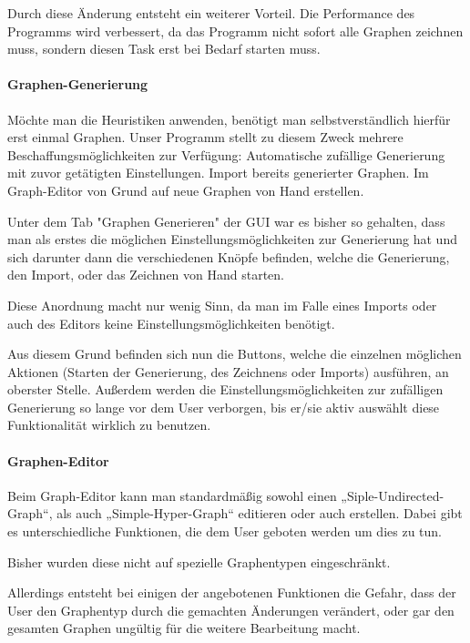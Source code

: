 \documentclass{article}
\begin{document}
				Durch diese Änderung entsteht ein weiterer Vorteil.
				Die Performance des Programms wird verbessert, da das Programm nicht sofort alle Graphen zeichnen muss, sondern diesen Task erst bei Bedarf starten muss.
		
		\paragraph{Graphen-Generierung}
			Möchte man die Heuristiken anwenden, benötigt man selbstverständlich hierfür erst einmal Graphen.
			Unser Programm stellt zu diesem Zweck mehrere Beschaffungsmöglichkeiten zur Verfügung:
				Automatische zufällige Generierung mit zuvor getätigten Einstellungen.
				Import bereits generierter Graphen.
				Im Graph-Editor von Grund auf neue Graphen von Hand erstellen.
			
			Unter dem Tab "Graphen Generieren" der GUI war es bisher so gehalten, dass man als erstes die möglichen Einstellungsmöglichkeiten zur Generierung hat und sich darunter dann die verschiedenen Knöpfe befinden, welche die Generierung, den Import, oder das Zeichnen von Hand starten.
			
			Diese Anordnung macht nur wenig Sinn, da man im Falle eines Imports oder auch des Editors keine Einstellungsmöglichkeiten benötigt.
			
			Aus diesem Grund befinden sich nun die Buttons, welche die einzelnen möglichen Aktionen (Starten der Generierung, des Zeichnens oder Imports) ausführen, an oberster Stelle.
			Außerdem werden die Einstellungsmöglichkeiten zur zufälligen Generierung so lange vor dem User verborgen, bis er/sie aktiv auswählt diese Funktionalität wirklich zu benutzen.
	
		\paragraph{Graphen-Editor}
			Beim Graph-Editor kann man standardmäßig sowohl einen „Siple-Undirected-Graph“, als auch „Simple-Hyper-Graph“ editieren oder auch erstellen.
			Dabei gibt es unterschiedliche Funktionen, die dem User geboten werden um dies zu tun.
			
			Bisher wurden diese nicht auf spezielle Graphentypen eingeschränkt.
			
			Allerdings entsteht bei einigen der angebotenen Funktionen die Gefahr, dass der User den Graphentyp durch die gemachten Änderungen verändert, oder gar den gesamten Graphen ungültig für die weitere Bearbeitung macht.
			
\end{document}
